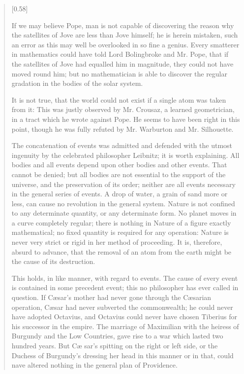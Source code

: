 \begin{verse}[0.58\textwidth]
{If we may believe Pope, man is not capable of discovering the reason
why the satellites of Jove are less than Jove himself; he is herein
mistaken, such an error as this may well be overlooked in so fine a
genius. Every smatterer in mathematics could have told Lord
Bolingbroke and Mr. Pope, that if the satellites of Jove had equalled
him in magnitude, they could not have moved round him; but no
mathematician is able to discover the regular gradation in the bodies
of the solar system.

It is not true, that the world could not exist if a single atom was
taken from it: This was justly observed by Mr. Crousaz, a learned
geometrician, in a tract which he wrote against Pope. He seems to have
been right in this point, though he was fully refuted by Mr. Warburton
and Mr. Silhouette.

The concatenation of events was admitted and defended with the utmost
ingenuity by the celebrated philosopher Leibnitz; it is worth
explaining. All bodies and all events depend upon other bodies and
other events. That cannot be denied; but all bodies are not essential
to the support of the universe, and the preservation of its order;
neither are all events necessary in the general series of events. A
drop of water, a grain of sand more or less, can cause no revolution
in the general system. Nature is not confined to any determinate
quantity, or any determinate form. No planet moves in a curve
completely regular; there is nothing in Nature of a figure exactly
mathematical; no fixed quantity is required for any operation: Nature
is never very strict or rigid in her method of proceeding. It is,
therefore, absurd to advance, that the removal of an atom from the
earth might be the cause of its destruction.


This holds, in like manner, with regard to events. The cause of every
event is contained in some precedent event; this no philosopher has
ever called in question. If C\ae sar's mother had never gone through
the C\ae sarian operation, C\ae sar had never subverted the
commonwealth; he could never have adopted Octavius, and Octavius could
never have chosen Tiberius for his successor in the empire. The
marriage of Maximilian with the heiress of Burgundy and the Low
Countries, gave rise to a war which lasted two hundred years. But C\ae
sar's spitting on the right or left side, or the Duchess of Burgundy's
dressing her head in this manner or in that, could nave altered
nothing in the general plan of Providence.

}
\end{verse}
